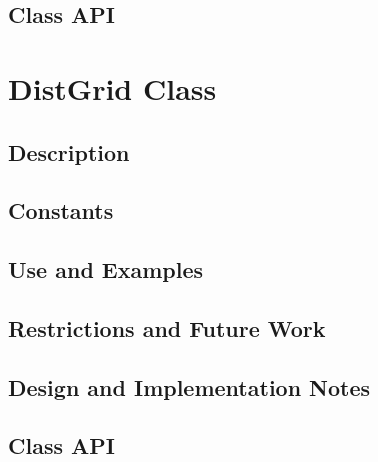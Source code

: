 \documentclass[english]{article}
\begin{document}
\subsection{Class API}



%
\section{DistGrid Class}
\subsection{Description}

\subsection{Constants}

\subsection{Use and Examples}


\subsection{Restrictions and Future Work}

\subsection{Design and Implementation Notes}

\subsection{Class API}

\end{document}
